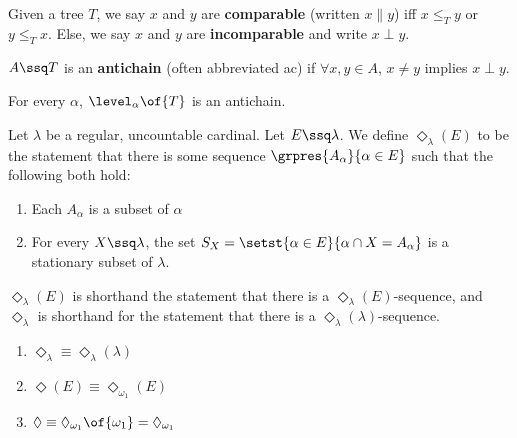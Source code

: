 \begin{boxdefinition}
    Given a tree $T$, we say $x$ and $y$ are \textbf{comparable} (written $x \parallel y$) iff $x \leq_T y$ or $y \leq_T x$. Else, we say $x$ and $y$ are \textbf{incomparable} and write $x \perp y$.
\end{boxdefinition}

\begin{boxdefinition}[Antichain]
    $A \ssq T$ is an \textbf{antichain} (often abbreviated ac) if $\forall x, y \in A$, $x \neq y$ implies $x \perp y$.
\end{boxdefinition}

\begin{boxexample}
    For every $\alpha$, $\level_{\alpha}\of{T}$ is an antichain.
\end{boxexample}



\begin{boxdefinition}[$\Diamond$]
    Let $\lambda$ be a regular, uncountable cardinal. Let $E \ssq \lambda$. We define \textbf{$\Diamond_{\lambda}(E)$} to be the statement that there is some sequence $\grpres{A_{\alpha}}{\alpha \in E}$ such that the following both hold:
    \begin{enumerate}
        \item Each $A_{\alpha}$ is a subset of $\alpha$
        \item For every $X \ssq \lambda$, the set $S_X = \setst{\alpha \in E}{\alpha \cap X = A_{\alpha}}$ is a stationary subset of $\lambda$.
    \end{enumerate}
    $\Diamond_{\lambda}(E)$ is shorthand the statement that there is a $\Diamond_{\lambda}(E)$-sequence, and $\Diamond_{\lambda}$ is shorthand for the statement that there is a $\Diamond_{\lambda}(\lambda)$-sequence.
\end{boxdefinition}

\begin{boxproposition}\hfill
    \begin{enumerate}
        \item $\Diamond_{\lambda} \equiv \Diamond_{\lambda}(\lambda)$
        \item $\Diamond(E) \equiv  \Diamond_{\omega_1}(E)$
        \item $\Diamond \equiv \Diamond_{\omega_1}\of{\omega_1} = \Diamond_{\omega_1}$
    \end{enumerate}
\end{boxproposition}

